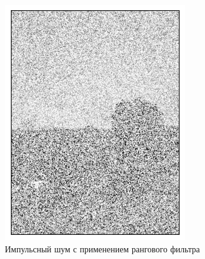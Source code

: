 \documentclass[a4paper,12pt]{article}
\begin{document}
\begin{figure}[H]
    \begin{minipage}{0.49\textwidth}
        \centering \includegraphics[width=\textwidth]{results/nlf_sap_4.png}
        \caption{Импульсный шум с применением рангового фильтра}
    \end{minipage}\hfill
    \begin{minipage}{0.49\textwidth}

\end{minipage}
\end{figure}
\end{document}
